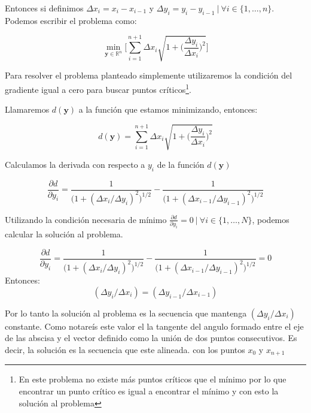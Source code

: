 Entonces si definimos $\Delta x_i = x_i - x_{i-1}$ y $\Delta y_i = y_i - y_{i-1}  \ | \ \forall i \in \{ 1,\dots,n\}$. Podemos escribir el problema como:

\begin{equation} 
    \min_{\bm{y} \in \mathbb{R}^n} \Bigg[ \sum_{i=1}^{n+1}  \Delta x_i \sqrt{1 + \Bigg( \frac{\Delta y_i}{\Delta x_i } \Bigg)^2 }\Bigg] 
\end{equation}

Para resolver el problema planteado simplemente utilizaremos la condición del gradiente igual a cero  para buscar puntos críticos\footnote{En este problema no existe más puntos críticos que el mínimo por lo que encontrar un punto crítico es igual a encontrar el mínimo y con esto la solución al problema}. 

Llamaremos $d(\bm{y})$ a la función que estamos minimizando, entonces: 

\begin{equation}\label{DiscProb}
    d(\bm{y}) = \sum_{i=1}^{n+1}  \Delta x_i \sqrt{1 + \Bigg( \frac{\Delta y_i}{\Delta x_i } \Bigg)^2 }
\end{equation}

Calculamos la derivada con respecto a $y_i$ de la función $ d(\bm{y})$

\begin{equation}
    \frac{\partial d}{\partial y_i } = 
    \frac{1}{ \big( 1 + (\Delta x_i /\Delta y_i)^2 \big)^{1/2}} -
    \frac{1}{ \big( 1 + (\Delta x_{i-1} /\Delta y_{i-1})^2 \big)^{1/2}} 
\end{equation}

Utilizando la condición necesaria de mínimo $\frac{\partial d }{ \partial y_i} = 0 \ | \ \forall i \in \{ 1, \dots, N \}$, podemos calcular la solución al problema.

\begin{equation}
    \frac{\partial d}{\partial y_i } = 
    \frac{1}{ \big( 1 + (\Delta x_i /\Delta y_i)^2 \big)^{1/2}} -
    \frac{1}{ \big( 1 + (\Delta x_{i-1} /\Delta y_{i-1})^2 \big)^{1/2}} = 0 
\end{equation}
Entonces:
\begin{equation}
    (\Delta y_i /\Delta x_i) = (\Delta y_{i-1} /\Delta x_{i-1}) 
\end{equation}

Por lo tanto la solución al problema es la secuencia que mantenga $(\Delta y_i / \Delta x_i)$ constante. Como notareís este valor el la tangente del angulo formado entre el eje de las abscisa y el vector definido como la unión de dos puntos consecutivos. Es decir, la solución es la secuencia que este alineada. con los puntos $x_0$ y $x_{n+1}$

